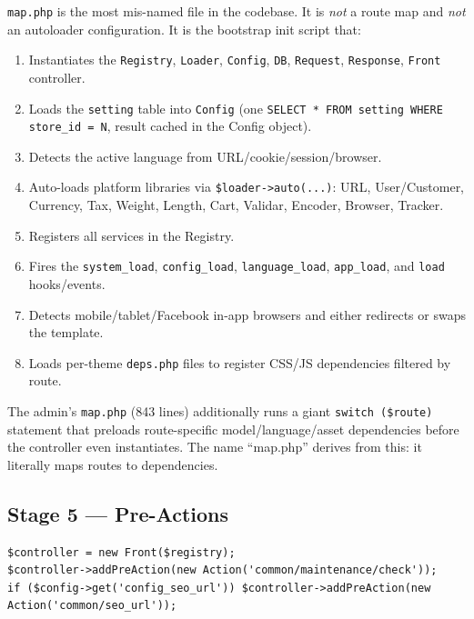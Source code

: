 \documentclass[11pt,a4paper]{article}
\begin{document}
\texttt{map.php} is the most mis-named file in the codebase. It is
\emph{not} a route map and \emph{not} an autoloader configuration.
It is the bootstrap init script that:

\begin{enumerate}[leftmargin=1.6em,itemsep=2pt]
  \item Instantiates the \texttt{Registry}, \texttt{Loader},
        \texttt{Config}, \texttt{DB}, \texttt{Request},
        \texttt{Response}, \texttt{Front} controller.
  \item Loads the \texttt{setting} table into \texttt{Config} (one
        \texttt{SELECT * FROM setting WHERE store\_id = N}, result
        cached in the Config object).
  \item Detects the active language from URL/cookie/session/browser.
  \item Auto-loads platform libraries via \texttt{\$loader->auto(...)}:
        URL, User/Customer, Currency, Tax, Weight, Length, Cart,
        Validar, Encoder, Browser, Tracker.
  \item Registers all services in the Registry.
  \item Fires the \texttt{system\_load}, \texttt{config\_load},
        \texttt{language\_load}, \texttt{app\_load}, and \texttt{load}
        hooks/events.
  \item Detects mobile/tablet/Facebook in-app browsers and either
        redirects or swaps the template.
  \item Loads per-theme \texttt{deps.php} files to register CSS/JS
        dependencies filtered by route.
\end{enumerate}

The admin's \texttt{map.php} (843 lines) additionally runs a giant
\texttt{switch (\$route)} statement that preloads route-specific
model/language/asset dependencies before the controller even
instantiates. The name ``map.php'' derives from this: it literally
maps routes to dependencies.

\subsection{Stage 5 --- Pre-Actions}

\begin{lstlisting}[caption={Pre-action registration in \texttt{web/index.php}.},label={lst:preactions}]
$controller = new Front($registry);
$controller->addPreAction(new Action('common/maintenance/check'));
if ($config->get('config_seo_url')) $controller->addPreAction(new Action('common/seo_url'));
\end{lstlisting}
\end{document}
